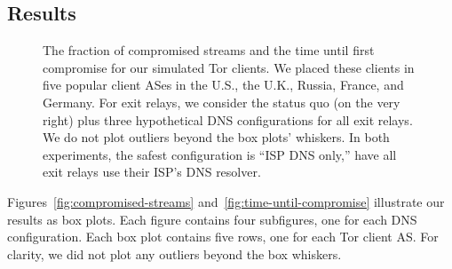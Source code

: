 \subsection{Results}

\begin{figure}[t]
\centering
{}
\caption{The fraction of compromised streams and the time until first compromise
for our simulated Tor clients.  We placed these clients in five popular client
ASes in the U.S., the U.K., Russia, France, and Germany.  For exit relays, we
consider the status quo (on the very right) plus three hypothetical DNS
configurations for all exit relays.  We do not plot outliers beyond the box
plots' whiskers.  In both experiments, the safest configuration is ``ISP DNS
only,'' \ie have all exit relays use their ISP's DNS resolver.}
\label{fig:fpt:var}
\end{figure}

Figures~\ref{fig:compromised-streams} and~\ref{fig:time-until-compromise}
illustrate our results as box plots.  Each figure contains four subfigures, one
for each DNS configuration.  Each box plot contains five rows, one for each Tor
client AS.  For clarity, we did not plot any outliers beyond the box whiskers.

